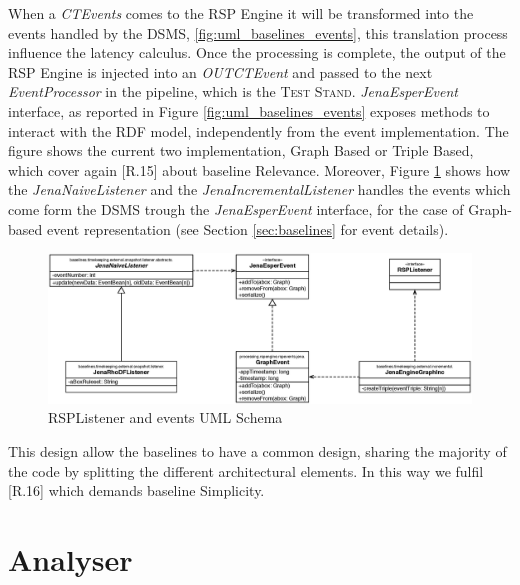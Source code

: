 When a \textit{CTEvents} comes to the RSP Engine it will be transformed into the events handled by the DSMS, \ref{fig:uml_baselines_events}, this translation process influence the latency calculus. Once the processing is complete, the output of the RSP Engine is injected into an \textit{OUTCTEvent} and passed to the next \textit{EventProcessor} in the pipeline, which is the \textsc{Test Stand}. \textit{JenaEsperEvent} interface, as reported in Figure \ref{fig:uml_baselines_events} exposes methods to interact with the RDF model, independently from the event implementation. The figure shows the current two implementation, Graph Based or Triple Based, which cover again [R.15] about baseline Relevance. Moreover, Figure \ref{fig:uml_baselines_rel_listener_event} shows how the \textit{JenaNaiveListener} and the  \textit{JenaIncrementalListener} handles the events which come form the DSMS trough the \textit{JenaEsperEvent} interface, for the case of Graph-based event representation (see Section \ref{sec:baselines} for event details). 

\begin{figure}[tbh]
  \centering
	\includegraphics[width=\linewidth]{images/uml_baselines_rel_listener_event}
	\caption{RSPListener and events UML Schema} 
  	\label{fig:uml_baselines_rel_listener_event}
\end{figure}

This design allow the baselines to have a common design, sharing the majority of the code by splitting the different architectural elements. In this way we fulfil [R.16] which demands baseline Simplicity.


\section{Analyser}\label{sec:analyser-impl}




